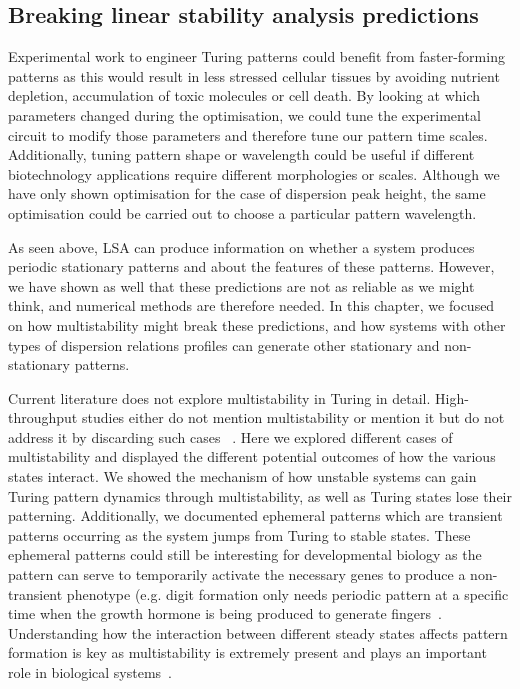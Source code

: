 \subsection*{Breaking linear stability analysis predictions}
Experimental work to engineer Turing patterns could benefit from faster-forming patterns as this would result in less stressed cellular tissues by avoiding nutrient depletion, accumulation of toxic molecules or cell death.
By looking at which parameters changed during the optimisation, we could tune the experimental circuit to modify those parameters and therefore tune our pattern time scales.
Additionally, tuning pattern shape or wavelength could be useful if different biotechnology applications require different morphologies or scales.
Although we have only shown optimisation for the case of dispersion peak height, the same optimisation could be carried out to choose a particular pattern wavelength.

As seen above, LSA can produce information on whether a system produces periodic stationary patterns and about the features of these patterns.
However, we have shown as well that these predictions are not as reliable as we might think, and numerical methods are therefore needed.
In this chapter, we focused on how multistability might break these predictions, and how systems with other types of dispersion relations profiles can generate other stationary and non-stationary patterns.

Current literature does not explore multistability in Turing in detail.
High-throughput studies either do not mention multistability or mention it but do not address it by discarding such cases ~\parencite{Scholes2019, Marcon, Zheng2016}.
Here we explored different cases of multistability and displayed the different potential outcomes of how the various states interact.
We showed the mechanism of how unstable systems can gain Turing pattern dynamics through multistability, as well as Turing states lose their patterning.
Additionally, we documented ephemeral patterns which are transient patterns occurring as the system jumps from Turing to stable states.
These ephemeral patterns could still be interesting for developmental biology as the pattern can serve to temporarily activate the necessary genes to produce a non-transient phenotype (e.g. digit formation only needs periodic pattern at a specific time when the growth hormone is being produced to generate fingers~\parencite{Raspopovic1}.
Understanding how the interaction between different steady states affects pattern formation is key as multistability is extremely present and plays an important role in biological systems~\parencite{laurent1999multistability}.

